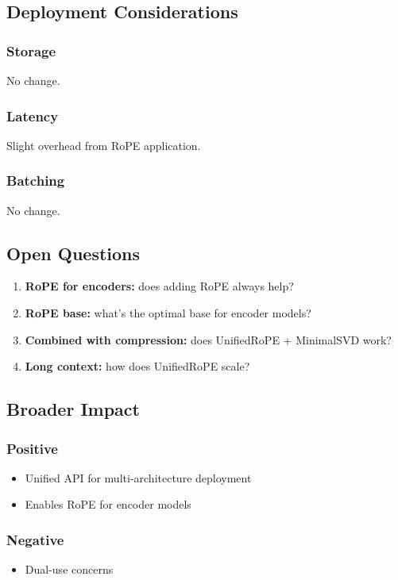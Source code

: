 {\subsection{Deployment Considerations}

\subsubsection{Storage}
No change.

\subsubsection{Latency}
Slight overhead from RoPE application.

\subsubsection{Batching}
No change.

\subsection{Open Questions}

\begin{enumerate}
\item \textbf{RoPE for encoders:} does adding RoPE always help?
\item \textbf{RoPE base:} what's the optimal base for encoder models?
\item \textbf{Combined with compression:} does UnifiedRoPE + MinimalSVD work?
\item \textbf{Long context:} how does UnifiedRoPE scale?

\end{enumerate}
\subsection{Broader Impact}

\subsubsection{Positive}
\begin{itemize}
\item Unified API for multi-architecture deployment
\item Enables RoPE for encoder models

\end{itemize}
\subsubsection{Negative}
\begin{itemize}
\item Dual-use concerns


\end{itemize}}
